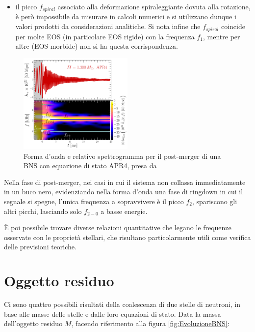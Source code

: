 \begin{itemize}
   	\item il picco $f_{spiral}$ associato alla deformazione spiraleggiante dovuta alla rotazione, è però impossibile da misurare in calcoli numerici e si utilizzano dunque i valori prodotti da considerazioni analitiche. Si nota infine che $f_{spiral}$ coincide per molte EOS (in particolare EOS rigide) con la frequenza $f_1$, mentre per altre (EOS morbide) non si ha questa corrispondenza.
\end{itemize}

\begin{figure}
	\vspace{-10pt}
	\begin{center}
		\includegraphics[width=0.5\textwidth]{figures/Capitolo_1/GW_spectrogram_APR4-q10-M1300.pdf}
	\end{center}
	\vspace{-10pt}
	\caption{Forma d'onda e relativo spettrogramma per il post-merger di una BNS con equazione di stato APR4, presa da \cite{Rezzolla_2016}}
	\label{fig:spettrogramma_postmerger_APR4}
	\vspace{-50pt}
\end{figure}

Nella fase di post-merger, nei casi in cui il sistema non collassa immediatamente in un buco nero, evidenziando nella forma d'onda una fase di ringdown in cui il segnale si spegne, l'unica frequenza a sopravvivere è il picco $f_2$, spariscono gli altri picchi, lasciando solo $f_{2-0}$ a basse energie.

È poi possibile trovare diverse relazioni quantitative che legano le frequenze osservate con le proprietà stellari, che risultano particolarmente utili come verifica delle previsioni teoriche.

\section{Oggetto residuo}
\label{section:residual}
Ci sono quattro possibili risultati della coalescenza di due stelle di neutroni, in base alle masse delle stelle e dalle loro equazioni di stato. 
Data la massa dell'oggetto residuo $M$, facendo riferimento alla figura \ref{fig:EvoluzioneBNS}:


